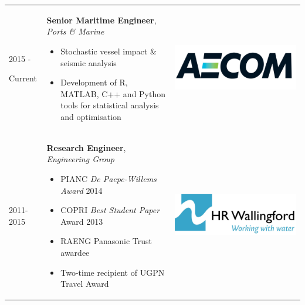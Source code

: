 \documentclass[letterpaper]{twentysecondcv} %
\begin{document}
\begin{table}[ht]
\centering
\begin{tabular}{p{} p{} m{}}

2015 - 

Current & \textbf{Senior Maritime Engineer}, \textit{Ports \& Marine}
\begin{itemize}[topsep=0pt]
\item Stochastic vessel impact \& seismic analysis
\item Development of R, MATLAB, C++ and Python tools for statistical analysis and optimisation
\end{itemize}
& \href{http://www.aecom.com/markets/transportation/ports-marine/}{\includegraphics[width = 0.75\linewidth]{Figures/AECOM.jpg}}
\\

2011-2015 & \textbf{Research Engineer}, \textit{Engineering Group} 
\begin{itemize}[topsep=0pt]
\item PIANC \textit{De Paepe-Willems Award} 2014  
\item COPRI \textit{Best Student Paper} Award 2013
\item RAENG Panasonic Trust awardee
\item Two-time recipient of UGPN Travel Award
\end{itemize}

& \href{http://www.hrwallingford.com/expertise/port-harbour-development}{\includegraphics[width = 0.75\linewidth]{Figures/HR-Wallingford-logo.jpg}}\\

\end{tabular}
\end{table}
\end{document}
